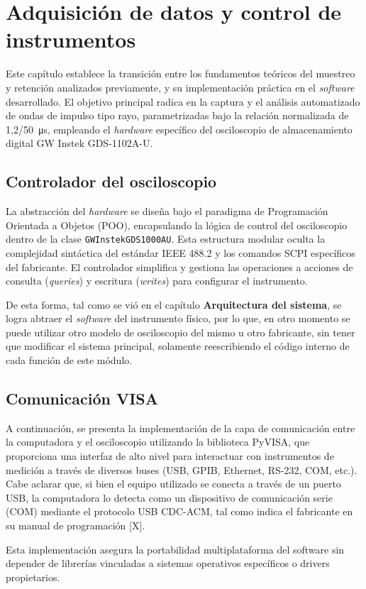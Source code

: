 \newpage
\chapter{Adquisición de datos y control de instrumentos}
\vspace{3\baselineskip}

Este capítulo establece la transición entre los fundamentos teóricos del muestreo y retención analizados previamente, y su implementación práctica en el \textit{software} desarrollado. El objetivo principal radica en la captura y el análisis automatizado de ondas de impulso tipo rayo, parametrizadas bajo la relación normalizada de \SI[parse-numbers=false]{1,2/50}{\micro\second}, empleando el \textit{hardware} específico del osciloscopio de almacenamiento digital GW Instek GDS-1102A-U.

\section{Controlador del osciloscopio}
La abstracción del \textit{hardware} se diseña bajo el paradigma de Programación Orientada a Objetos (POO), encapsulando la lógica de control del osciloscopio dentro de la clase \texttt{GWInstekGDS1000AU}. Esta estructura modular oculta la complejidad sintáctica del estándar IEEE 488.2 y los comandos SCPI específicos del fabricante. El controlador simplifica y gestiona las operaciones a acciones de consulta (\textit{queries}) y escritura (\textit{writes}) para configurar el instrumento.\par
De esta forma, tal como se vió en el capítulo \textbf{Arquitectura del sistema}, se logra abtraer el \textit{software} del instrumento físico, por lo que, en otro momento se puede utilizar otro modelo de osciloscopio del mismo u otro fabricante, sin tener que modificar el sistema principal, solamente reescribiendo el código interno de cada función de este módulo.\par

\section{Comunicación VISA}
A continuación, se presenta la implementación de la capa de comunicación entre la computadora y el osciloscopio utilizando la biblioteca PyVISA, que proporciona una interfaz de alto nivel para interactuar con instrumentos de medición a través de diversos buses (USB, GPIB, Ethernet, RS-232, COM, etc.). Cabe aclarar que, si bien el equipo utilizado se conecta a través de un puerto USB, la computadora lo detecta como un dispositivo de comunicación serie (COM) mediante el protocolo USB CDC-ACM, tal como indica el fabricante en su manual de programación [X].\par
Esta implementación asegura la portabilidad multiplataforma del software sin depender de librerías vinculadas a sistemas operativos específicos o drivers propietarios.

